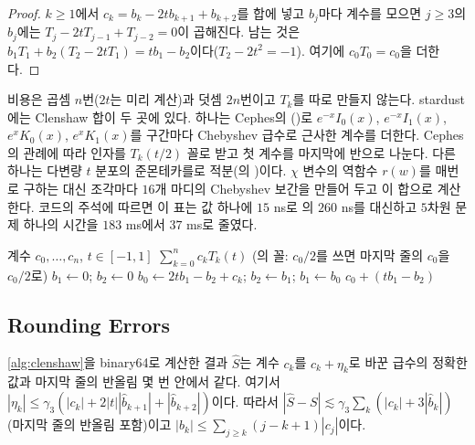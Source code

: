\begin{proof}
$k\ge1$에서 $c_k=b_k-2tb_{k+1}+b_{k+2}$를 합에 넣고 $b_j$마다 계수를 모으면 $j\ge3$의 $b_j$에는 $T_j-2tT_{j-1}+T_{j-2}=0$이 곱해진다. 남는 것은 $b_1T_1+b_2(T_2-2tT_1)=tb_1-b_2$이다($T_2-2t^2=-1$). 여기에 $c_0T_0=c_0$을 더한다.
\end{proof}

비용은 곱셈 $n$번($2t$는 미리 계산)과 덧셈 $2n$번이고 $T_k$를 따로 만들지 않는다. stardust에는 Clenshaw 합이 두 곳에 있다. 하나는 Cephes의 ()로 $e^{-x}I_0(x)$, $e^{-x}I_1(x)$, $e^xK_0(x)$, $e^xK_1(x)$를 구간마다 Chebyshev 급수로 근사한 계수를 더한다. Cephes의 관례에 따라 인자를 $T_k(t/2)$ 꼴로 받고 첫 계수를 마지막에 반으로 나눈다. 다른 하나는 다변량 $t$ 분포의 준몬테카를로 적분(의 )이다. $\chi$ 변수의 역함수 $r(w)$를 매번 로 구하는 대신 조각마다 $16$개 마디의 Chebyshev 보간을 만들어 두고 이 합으로 계산한다. 코드의 주석에 따르면 이 표는 값 하나에 $15$ ns로 의 $260$ ns를 대신하고 $5$차원 문제 하나의 시간을 $183$ ms에서 $37$ ms로 줄였다.

\begin{algorithm}[htbp]
\begin{algorithmic}[1]
\Require 계수 $c_0,\dots,c_n$, $t\in[-1,1]$
\Ensure $\sum_{k=0}^nc_kT_k(t)$ (의 꼴: $c_0/2$를 쓰면 마지막 줄의 $c_0$을 $c_0/2$로)
\State $b_1\gets0$; $b_2\gets0$
  \State $b_0\gets2tb_1-b_2+c_k$; $b_2\gets b_1$; $b_1\gets b_0$
\EndFor
\State \Return $c_0+(tb_1-b_2)$ 
\end{algorithmic}
\caption{Clenshaw 합 (stardust 의 , 의 )}
\label{alg:clenshaw}
\end{algorithm}

\subsection{Rounding Errors}

\begin{proposition}
\label{prop:clenshaw-error}
\cref{alg:clenshaw}을 binary64로 계산한 결과 $\hat S$는 계수 $c_k$를 $c_k+\eta_k$로 바꾼 급수의 정확한 값과 마지막 줄의 반올림 몇 번 안에서 같다. 여기서 $|\eta_k|\le\gamma_3(|c_k|+2|t||\hat b_{k+1}|+|\hat b_{k+2}|)$이다. 따라서 $|\hat S-S|\lesssim\gamma_3\sum_k(|c_k|+3|\hat b_k|)$(마지막 줄의 반올림 포함)이고 $|b_k|\le\sum_{j\ge k}(j-k+1)|c_j|$이다.
\end{proposition}

